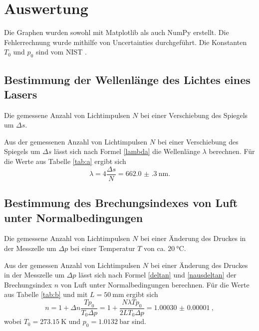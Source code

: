 \section{Auswertung}
\label{sec:Auswertung}


Die Graphen wurden sowohl mit Matplotlib \cite{matplotlib} als auch NumPy \cite{numpy} erstellt. Die
Fehlerrechnung wurde mithilfe von Uncertainties \cite{uncertainties} durchgeführt.
Die Konstanten $T_0$ und $p_0$ sind vom NIST \cite{nistgov}.

\subsection{Bestimmung der Wellenlänge des Lichtes eines Lasers}
\begin{table}
	\centering
	\caption{Die gemessene Anzahl von Lichtimpulsen $N$ bei einer Verschiebung des Spiegels um $\Delta s$.}
	
	\label{tab:a}
\end{table}
Aus der gemessenen Anzahl von Lichtimpulsen $N$ bei einer Verschiebung des Spiegels um $\Delta s$ lässt sich nach Formel \eqref{lambda} die Wellenlänge $\lambda$ berechnen.
Für die Werte aus Tabelle \ref{tab:a} ergibt sich
\begin{equation}
	\lambda = 4 \frac{\Delta s}{N}=\SI{662.0(3)}{\nano\meter}.
\end{equation}


\subsection{Bestimmung des Brechungsindexes von Luft unter Normalbedingungen}
\begin{table}
	\centering
	\caption{Die gemessene Anzahl von Lichtimpulsen $N$ bei einer Änderung des Druckes in der Messzelle um $\Delta p$ bei einer Temperatur $T$ von ca. $\SI{20}{\degreeCelsius}$.}
	
	\label{tab:b}
\end{table}
Aus der gemessen Anzahl von Lichtimpulsen $N$ bei einer Änderung des Druckes in der Messzelle um $\Delta p$ lässt sich nach Formel \eqref{deltan} und \eqref{nausdeltan} der Brechungsindex $n$ von Luft unter Normalbedingungen berechnen.
Für die Werte aus Tabelle \ref{tab:b} und mit $L=\SI{50}{\milli\meter}$ ergibt sich
\begin{equation}
	n = 1 + \Delta n \frac{T p_0}{T_0 \Delta p} = 1+ \frac{N \lambda T p_0}{2 L T_0 \Delta p} = \SI{1.00030(1)}{},
\end{equation}
wobei $T_0=\SI{273,15}{\kelvin}$ und $p_0=\SI{1,0132}{\bar}$ sind.
